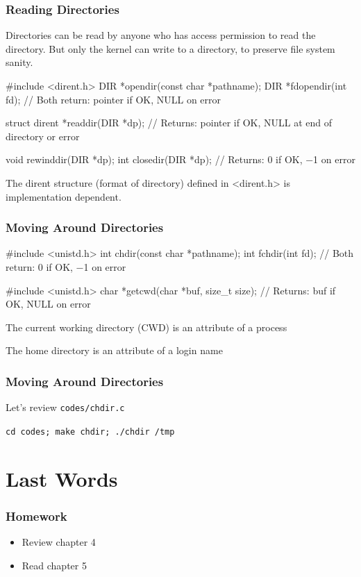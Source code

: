 \documentclass[newPxFont,sthlmFooter,nooffset]{beamer}
\begin{document}
\begin{frame}[containsverbatim,t]
  \frametitle{Reading Directories}
Directories can be read by anyone who has access permission to read the directory. But only the kernel can write to a directory, to preserve file system sanity.

\begin{codedef}
#include <dirent.h>
DIR *opendir(const char *pathname);
DIR *fdopendir(int fd);
// Both return: pointer if OK, NULL on error

struct dirent *readdir(DIR *dp);
// Returns: pointer if OK, NULL at end of directory or error

void rewinddir(DIR *dp);
int closedir(DIR *dp);
// Returns: 0 if OK, −1 on error
\end{codedef}


The dirent structure (format of directory) defined in <dirent.h> is implementation dependent.


\end{frame}



\begin{frame}[containsverbatim,t]
  \frametitle{Moving Around Directories}

\begin{codedef}
#include <unistd.h>
int chdir(const char *pathname);
int fchdir(int fd);
// Both return: 0 if OK, −1 on error

#include <unistd.h>
char *getcwd(char *buf, size_t size);
// Returns: buf if OK, NULL on error
\end{codedef}

The current working directory (CWD) is an attribute of a process

The home directory is an attribute of a login name
\end{frame}



\begin{frame}[containsverbatim,t]
  \frametitle{Moving Around Directories}
Let's review \texttt{codes/chdir.c}

\bigskip

\texttt{cd codes; make chdir; ./chdir /tmp}


\end{frame}


\section{Last Words}
\begin{frame}[t]
  \frametitle{Homework}

  \begin{itemize}
  \item Review chapter 4
  \item Read chapter 5
  \end{itemize}
\end{frame}
\end{document}
